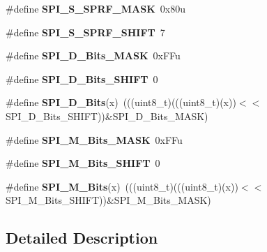 \begin{DoxyCompactItemize}
\#define {\bfseries S\+P\+I\+\_\+\+S\+\_\+\+S\+P\+R\+F\+\_\+\+M\+A\+SK}~0x80u
\item 
\mbox{\label{group___s_p_i___register___masks_ga8f3cb2c492f263ccb54220066f1bb04d}} 
\#define {\bfseries S\+P\+I\+\_\+\+S\+\_\+\+S\+P\+R\+F\+\_\+\+S\+H\+I\+FT}~7
\item 
\mbox{\label{group___s_p_i___register___masks_ga4be13a4d32a80a5054b5c7b555cacf96}} 
\#define {\bfseries S\+P\+I\+\_\+\+D\+\_\+\+Bits\+\_\+\+M\+A\+SK}~0x\+F\+Fu
\item 
\mbox{\label{group___s_p_i___register___masks_ga7b4038420399880e8554f8078e0fc4a8}} 
\#define {\bfseries S\+P\+I\+\_\+\+D\+\_\+\+Bits\+\_\+\+S\+H\+I\+FT}~0
\item 
\mbox{\label{group___s_p_i___register___masks_gaef5e938b19ce8cb77e0af81415e27d2a}} 
\#define {\bfseries S\+P\+I\+\_\+\+D\+\_\+\+Bits}(x)~(((uint8\+\_\+t)(((uint8\+\_\+t)(x))$<$$<$S\+P\+I\+\_\+\+D\+\_\+\+Bits\+\_\+\+S\+H\+I\+FT))\&S\+P\+I\+\_\+\+D\+\_\+\+Bits\+\_\+\+M\+A\+SK)
\item 
\mbox{\label{group___s_p_i___register___masks_ga9767f876397867fe5481f0f2e8fe7426}} 
\#define {\bfseries S\+P\+I\+\_\+\+M\+\_\+\+Bits\+\_\+\+M\+A\+SK}~0x\+F\+Fu
\item 
\mbox{\label{group___s_p_i___register___masks_ga260750fc368376f78fd1fbdea6353327}} 
\#define {\bfseries S\+P\+I\+\_\+\+M\+\_\+\+Bits\+\_\+\+S\+H\+I\+FT}~0
\item 
\mbox{\label{group___s_p_i___register___masks_ga1884f92ef71c445ab9969f1c474635d3}} 
\#define {\bfseries S\+P\+I\+\_\+\+M\+\_\+\+Bits}(x)~(((uint8\+\_\+t)(((uint8\+\_\+t)(x))$<$$<$S\+P\+I\+\_\+\+M\+\_\+\+Bits\+\_\+\+S\+H\+I\+FT))\&S\+P\+I\+\_\+\+M\+\_\+\+Bits\+\_\+\+M\+A\+SK)
\end{DoxyCompactItemize}


\subsection{Detailed Description}
